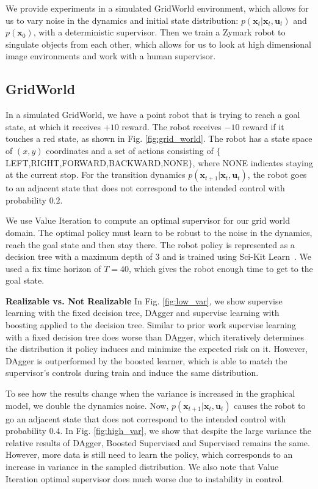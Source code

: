 \documentclass[10pt, conference]{ieeeconf}      %
\newcommand{\bu}{\mathbf{u}}
\newcommand{\bx}{\mathbf{x}}
\begin{document}
We provide experiments in a simulated GridWorld environment, which allows for us to vary noise in the dynamics and initial state distribution: $p(\bx_t|\bx_t,\bu_t)$ and $p(\bx_0)$, with a deterministic supervisor. Then we  train a Zymark robot to singulate objects from each other, which allows for us to look at high dimensional image environments and work with a human supervisor. 
\subsection{GridWorld}\label{sec:gdw}
In a simulated GridWorld, we have a point robot that is trying to reach a goal state, at which it receives $+10$ reward. The robot receives $-10$ reward if it touches a red state, as shown in Fig. \ref{fig:grid_world}. The robot has a state space of $(x,y)$ coordinates and a set of actions consisting of $\lbrace$LEFT,RIGHT,FORWARD,BACKWARD,NONE$\rbrace$, where NONE indicates staying at the current stop. For the transition dynamics $p(\bx_{t+1}|\bx_{t},\bu_t)$, the robot goes to an adjacent state that does not correspond to the intended control with probability $0.2$. 

We use Value Iteration to compute an optimal supervisor for our grid world domain. The optimal policy must learn to be robust to the noise in the dynamics, reach the goal state and then stay there. The robot policy is represented as a decision tree with a maximum depth of $3$ and is trained using Sci-Kit Learn~\cite{scikit-learn}. We used a fix time horizon of $T=40$, which gives the robot enough time to get to the goal state. 


\noindent \textbf{Realizable vs. Not Realizable} In Fig. \ref{fig:low_var}, we show supervise learning with the fixed decision tree, DAgger and supervise learning with boosting applied to the decision tree. Similar to prior work supervise learning with a fixed decision tree does worse than DAgger, which iteratively determines the distribution it policy induces and minimize the expected risk on it. However, DAgger is outperformed by the boosted learner, which is able to match the supervisor's controls during train and induce the same distribution. 

To see how the results change when the variance is increased in the graphical model, we double the dynamics noise. Now, $p(\bx_{t+1}|\bx_t,\bu_t)$ causes the robot to go an adjacent state that does not correspond to the intended control with probability $0.4$. In Fig. \ref{fig:high_var}, we show that despite the large variance the relative results of DAgger, Boosted Supervised and Supervised remains the same. However, more data is still need to learn the policy, which corresponds to an increase in variance in the sampled distribution. We also note that Value Iteration optimal supervisor does much worse due to instability in control. 
\end{document}

